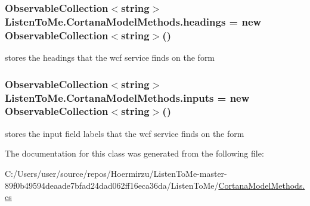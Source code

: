 \subsubsection[{\texorpdfstring{headings}{headings}}]{\setlength{\rightskip}{0pt plus 5cm}Observable\+Collection$<$string$>$ Listen\+To\+Me.\+Cortana\+Model\+Methods.\+headings = new Observable\+Collection$<$string$>$()\hspace{0.3cm}{\ttfamily [package]}}\hypertarget{class_listen_to_me_1_1_cortana_model_methods_a163bfa4e5d0d538593edc2802a3d9b42}{}\label{class_listen_to_me_1_1_cortana_model_methods_a163bfa4e5d0d538593edc2802a3d9b42}


stores the headings that the wcf service finds on the form 

\subsubsection[{\texorpdfstring{inputs}{inputs}}]{\setlength{\rightskip}{0pt plus 5cm}Observable\+Collection$<$string$>$ Listen\+To\+Me.\+Cortana\+Model\+Methods.\+inputs = new Observable\+Collection$<$string$>$()\hspace{0.3cm}{\ttfamily [package]}}\hypertarget{class_listen_to_me_1_1_cortana_model_methods_ab5c02fb296556b31d87eab09fea7c514}{}\label{class_listen_to_me_1_1_cortana_model_methods_ab5c02fb296556b31d87eab09fea7c514}


stores the input field labels that the wcf service finds on the form 



The documentation for this class was generated from the following file\+:\begin{DoxyCompactItemize}
\item 
C\+:/\+Users/user/source/repos/\+Hoermirzu/\+Listen\+To\+Me-\/master-\/89f0b49594deaade7bfad24dad062ff16eca36da/\+Listen\+To\+Me/\hyperlink{_cortana_model_methods_8cs}{Cortana\+Model\+Methods.\+cs}\end{DoxyCompactItemize}
